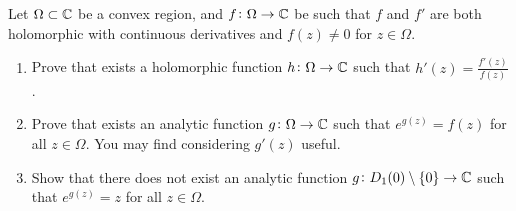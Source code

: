 \documentclass[11pt,a4paper]{article}
\begin{document}
\begin{exercise}
  Let $\Omega \subset \mathbb{C}$ be a convex region, and $f \colon \Omega \to \mathbb{C}$
  be such that $f$ and $f'$ are both holomorphic with continuous derivatives
  and $f(z) \neq 0$ for $z \in \Omega$.
  \begin{enumerate}
    \item[(1)] Prove that exists a holomorphic function $h \colon \Omega \to \mathbb{C}$
      such that $h'(z) = \frac{f'(z)}{f(z)}$.
    \item[(2)] Prove that exists an analytic function $g \colon \Omega \to \mathbb{C}$
      such that $e^{g(z)} = f(z)$ for all $z \in \Omega$.
      You may find considering $g'(z)$ useful.
    \item[(3)] Show that there does not exist an analytic function
      $g \colon D_1(0) \setminus \left\{0\right\} \to \mathbb{C}$ such that
      $e^{g(z)} = z$ for all $z \in \Omega$.
  \end{enumerate}
\end{exercise}
\end{document}
